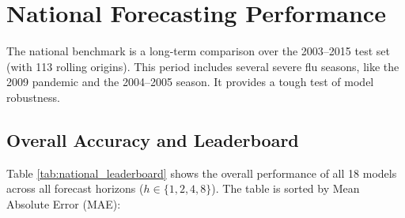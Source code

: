 
\section{National Forecasting Performance}

The national benchmark is a long-term comparison over the 2003--2015 test set (with 113 rolling origins). This period includes several severe flu seasons, like the 2009 pandemic and the 2004--2005 season. It provides a tough test of model robustness.

\subsection{Overall Accuracy and Leaderboard}
Table \ref{tab:national_leaderboard} shows the overall performance of all 18 models across all forecast horizons ($h \in \{1, 2, 4, 8\}$). The table is sorted by Mean Absolute Error (MAE):

